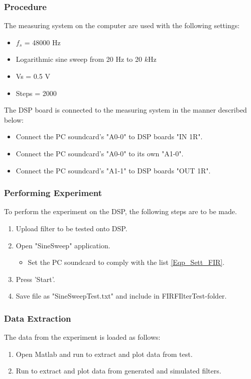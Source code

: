 \subsubsection{Procedure}\label{Eqp_Sett_FIR}

The measuring system on the computer are used with the following settings:
\begin{itemize}
	\item $f_s$ = 48000 Hz
	\item Logarithmic sine sweep from 20 Hz to 20 $k$Hz
	\item Vs = 0.5 V
	\item Steps = 2000
\end{itemize}

The DSP board is connected to the measuring system in the manner described below:
	\begin{itemize}
		\item Connect the PC soundcard's "A0-0" to DSP boards "IN 1R".
		\item Connect the PC soundcard's "A0-0" to its own "A1-0".
		\item Connect the PC soundcard's "A1-1" to DSP boards "OUT 1R".
	\end{itemize}
	
\subsubsection{Performing Experiment}
To perform the experiment on the DSP, the following steps are to be made.
	\begin{enumerate}
		\item Upload filter to be tested onto DSP.
		\item Open "SineSweep" application.
		\begin{itemize}
			 \item Set the PC soundcard to comply with the list \autoref{Eqp_Sett_FIR}.
		\end{itemize}
		\item Press 'Start'.
		\item Save file as "SineSweepTest.txt" and include in FIRFIlterTest-folder.
	\end{enumerate}


\subsubsection{Data Extraction}
The data from the experiment is loaded as follows:
	\begin{enumerate}
		\item Open Matlab and run  to extract and plot data from test.
		\item Run  to extract and plot data from generated and simulated filters.
	\end{enumerate}

